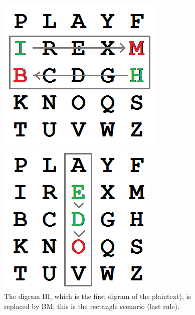\documentclass[Lau,binding=0.6cm,oneside]{sapthesis}
\begin{document}
\begin{figure}[H]
  \includegraphics[width=\linewidth]{playfair_1}
  \caption{The digram \textsf{HI}, which is the first digram of the plaintext), is replaced by \textsf{BM}; this is the rectangle scenario (last rule).}
\endminipage\hfill
{}
  \includegraphics[width=\linewidth]{playfair_2}

\end{figure}
\end{document}
